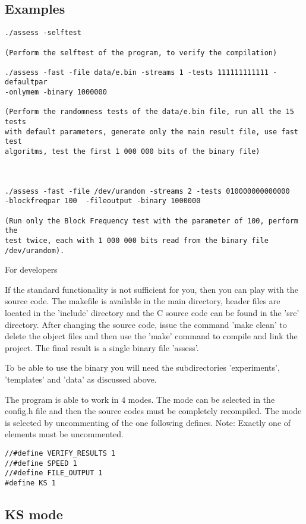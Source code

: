 \documentclass[12pt]{article}
\begin{document}
\subsection*{Examples}
\begin{verbatim}
./assess -selftest

(Perform the selftest of the program, to verify the compilation)

./assess -fast -file data/e.bin -streams 1 -tests 111111111111 -defaultpar
-onlymem -binary 1000000

(Perform the randomness tests of the data/e.bin file, run all the 15 tests
with default parameters, generate only the main result file, use fast test
algoritms, test the first 1 000 000 bits of the binary file)



./assess -fast -file /dev/urandom -streams 2 -tests 010000000000000 
-blockfreqpar 100  -fileoutput -binary 1000000

(Run only the Block Frequency test with the parameter of 100, perform the
test twice, each with 1 000 000 bits read from the binary file 
/dev/urandom).
\end{verbatim}

\newpage
{\hfil\LARGE{\textsf{For developers}}}
\bigskip\bigskip

If the standard functionality is not sufficient for you, then you can play with the source code. The makefile is available in the main directory, header files are located in the 'include' directory and the C source code can be found in the 'src' directory. After changing the source code, issue the command 'make clean' to delete the object files and then use the 'make' command to compile and link the project. The final result is a single binary file 'assess'.

To be able to use the binary you will need the subdirectories 'experiments', 'templates' and 'data' as discussed above.

The program is able to work in 4 modes. The mode can be selected in the config.h file and then the source codes must be completely recompiled. The mode is selected by uncommenting of the one following defines. Note: Exactly one of elements must be uncommented.
\begin{verbatim}
//#define VERIFY_RESULTS 1
//#define SPEED 1
//#define FILE_OUTPUT 1
#define KS 1
\end{verbatim}

\subsection*{KS mode}
\end{document}
